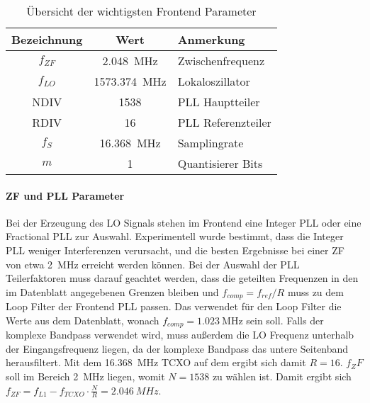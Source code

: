 \begin{table}[htbp]
    \ttabbox
    {
        \caption[Zusammenfassung Frontend Parameter]{Übersicht der wichtigsten Frontend Parameter}
        \label{TabFrontendParams}
    }
    {
    \begin{tabular}{c S l}
        \toprule
        Bezeichnung             &  {Wert} & Anmerkung\\
        \midrule
        $f_{ZF}$      & \SI{2.048}{\MHz}      & Zwischenfrequenz\\
        $f_{LO}$      & \SI{1573.374}{\MHz}   & Lokaloszillator\\
        NDIV        & \num{1538}            & PLL Hauptteiler\\
        RDIV        & \num{16}              & PLL Referenzteiler\\
        $f_S$       & \SI{16.368}{\MHz}     & Samplingrate \\
        $m$           & \num{1}               & Quantisierer Bits \\
        \bottomrule
    \end{tabular}
    }
\end{table}


\paragraph{ZF und PLL Parameter}
Bei der Erzeugung des LO Signals stehen im Frontend eine Integer PLL oder eine Fractional PLL zur Auswahl. Experimentell wurde bestimmt, dass die Integer PLL weniger Interferenzen verursacht, und die besten Ergebnisse bei einer ZF von etwa \SI{2}{\MHz} erreicht werden können. Bei der Auswahl der PLL Teilerfaktoren muss darauf geachtet werden, dass die geteilten Frequenzen in den im Datenblatt \cite{max2769} angegebenen Grenzen bleiben und $f_{comp}=f_{ref}/R$ muss zu dem Loop Filter der Frontend PLL passen. Das \comboard verwendet für den Loop Filter die Werte aus dem Datenblatt, wonach $f_{comp}=\SI{1.023}{\MHz}$ sein soll. Falls der komplexe Bandpass verwendet wird, muss außerdem die LO Frequenz unterhalb der Eingangsfrequenz liegen, da der komplexe Bandpass das untere Seitenband herausfiltert.
Mit dem \SI{16.368}{MHz} \gls{TCXO} auf dem \comboard ergibt sich damit $R=16$. $f_ZF$ soll im Bereich \SI{2}{\MHz} liegen, womit $N=1538$ zu wählen ist. Damit ergibt sich $f_{ZF}=f_{L1}-f_{TCXO}\cdot \frac{N}{R}=\SI{2.046}{MHz}$.

